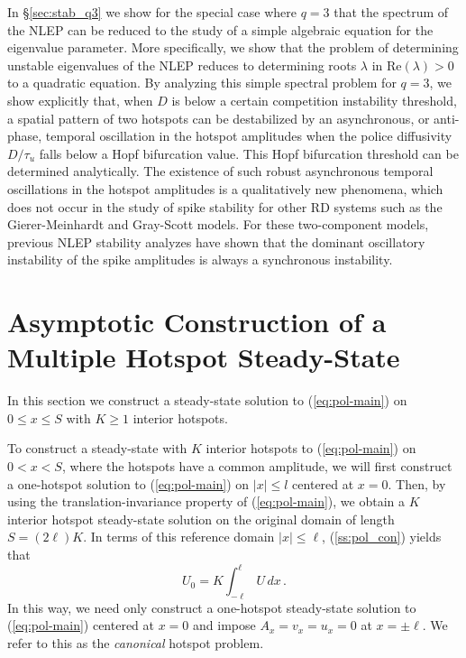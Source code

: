 \documentclass{article}%
\begin{document}
In \S \ref{sec:stab_q3} we show for the special case where $q=3$ that
the spectrum of the NLEP can be reduced to the study of a simple
algebraic equation for the eigenvalue parameter. More specifically, we
show that the problem of determining unstable eigenvalues of the NLEP
reduces to determining roots $\lambda$ in $\mbox{Re}(\lambda)>0$ to a
quadratic equation. By analyzing this simple spectral problem for
$q=3$, we show explicitly that, when $D$ is below a certain
competition instability threshold, a spatial pattern of two hotspots
can be destabilized by an asynchronous, or anti-phase, temporal
oscillation in the hotspot amplitudes when the police diffusivity
${D/\tau_u}$ falls below a Hopf bifurcation value. This Hopf
bifurcation threshold can be determined analytically. The existence of
such robust asynchronous temporal oscillations in the hotspot
amplitudes is a qualitatively new phenomena, which does not occur in
the study of spike stability for other RD systems such as the
Gierer-Meinhardt and Gray-Scott models. For these two-component
models, previous NLEP stability analyzes have shown that the dominant
oscillatory instability of the spike amplitudes is always a
synchronous instability.


\setcounter{equation}{0}
\setcounter{section}{1}
\section{\label{sec:pol-construction}Asymptotic Construction of a Multiple
Hotspot Steady-State}

In this section we construct a steady-state solution to
(\ref{eq:pol-main}) on $0\leq x\leq S$ with $K\geq 1$ interior
hotspots. 

To construct a steady-state with $K$ interior hotspots to
(\ref{eq:pol-main}) on $0<x<S$, where the hotspots have a common
amplitude, we will first construct a one-hotspot solution to
(\ref{eq:pol-main}) on $|x|\leq l$ centered at $x=0$. Then, by using
the translation-invariance property of (\ref{eq:pol-main}), we obtain
a $K$ interior hotspot steady-state solution on the original domain of
length $S=(2\ell)K$. In terms of this reference domain $|x|\leq \ell$,
(\ref{ss:pol_con}) yields that
\begin{equation}
U_{0}=K\int_{-\ell}^{\ell}U\, dx \,. \label{eq:U0-with-K}
\end{equation}
In this way, we need only construct a one-hotspot steady-state
solution to (\ref{eq:pol-main}) centered at $x=0$ and impose
$A_x=v_x=u_x=0$ at $x=\pm \ell$. We refer to this as the {\em
  canonical} hotspot problem.
\end{document}
